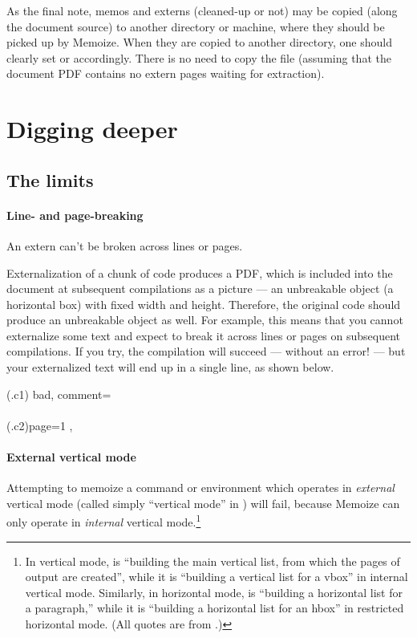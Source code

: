 \documentclass[a4paper,11pt]{article}
\begin{document}
As the final note, memos and externs (cleaned-up or not) may be copied (along
the document source) to another directory or machine, where they should be
picked up by Memoize.  When they are copied to another directory, one should
clearly set  or  accordingly.  There is no need
to copy the \dmmz file (assuming that the document PDF contains no extern pages
waiting for extraction).


\section{Digging deeper}
\label{sec:potential-pitfalls}



\subsection{The limits}
\label{sec:limits}


\paragraph{Line- and page-breaking} An extern can't be broken across lines or
pages.

Externalization of a chunk of code produces a PDF, which is included into the
document at subsequent compilations as a picture --- an unbreakable object (a
horizontal box) with fixed width and height.  Therefore, the original code
should produce an unbreakable object as well.  For example, this means that you
cannot externalize some text and expect  to break it across lines
or pages on subsequent compilations.  If you try, the compilation will succeed
--- without an error!  --- but your externalized text will end up in a single
line, as shown below.

(.c1){
  bad,
  comment={\centering
    \\[1ex]    
    \\[1ex]
    (.c2){page=1}
  },
}


\paragraph{External vertical mode}

Attempting to memoize a command or environment which operates in
\emph{external} vertical mode (called simply ``vertical mode'' in \TeXbook)
will fail, because Memoize can only operate in \emph{internal} vertical
mode.\footnote{In vertical mode,  is ``building the main vertical
  list, from which the pages of output are created'', while it is ``building a
  vertical list for a vbox'' in internal vertical mode.  Similarly, in
  horizontal mode,  is ``building a horizontal list for a
  paragraph,'' while it is ``building a horizontal list for an hbox'' in
  restricted horizontal mode.  (All quotes are from \TeXbook[85].)}
\end{document}
